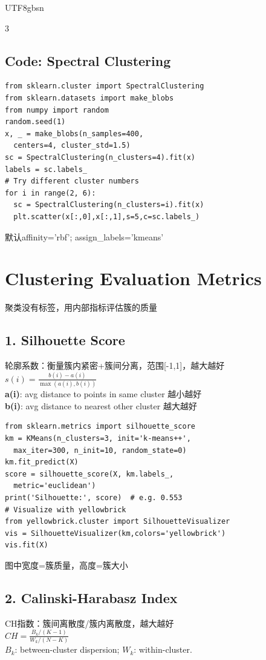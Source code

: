 \documentclass[9pt,landscape,a4paper]{article}
\newcommand{\zhint}[1]{{\scriptsize\color{gray!70!black}#1}}
\begin{document}
\begin{CJK}{UTF8}{gbsn}
\begin{multicols}{3}
\subsection{Code: Spectral Clustering}
\begin{lstlisting}
from sklearn.cluster import SpectralClustering
from sklearn.datasets import make_blobs
from numpy import random
random.seed(1)
x, _ = make_blobs(n_samples=400,
  centers=4, cluster_std=1.5)
sc = SpectralClustering(n_clusters=4).fit(x)
labels = sc.labels_
# Try different cluster numbers
for i in range(2, 6):
  sc = SpectralClustering(n_clusters=i).fit(x)
  plt.scatter(x[:,0],x[:,1],s=5,c=sc.labels_)
\end{lstlisting}
\zhint{默认affinity='rbf'; assign\_labels='kmeans'}

\section{Clustering Evaluation Metrics}
\zhint{聚类没有标签，用内部指标评估簇的质量}

\subsection{1. Silhouette Score}
\zhint{轮廓系数：衡量簇内紧密+簇间分离，范围[-1,1]，越大越好}\\
$s(i) = \frac{b(i) - a(i)}{\max(a(i), b(i))}$\\
\textbf{a(i)}: avg distance to points in same cluster \zhint{越小越好}\\
\textbf{b(i)}: avg distance to nearest other cluster \zhint{越大越好}

\begin{lstlisting}
from sklearn.metrics import silhouette_score
km = KMeans(n_clusters=3, init='k-means++',
  max_iter=300, n_init=10, random_state=0)
km.fit_predict(X)
score = silhouette_score(X, km.labels_,
  metric='euclidean')
print('Silhouette:', score)  # e.g. 0.553
# Visualize with yellowbrick
from yellowbrick.cluster import SilhouetteVisualizer
vis = SilhouetteVisualizer(km,colors='yellowbrick')
vis.fit(X)
\end{lstlisting}
\zhint{图中宽度=簇质量，高度=簇大小}

\subsection{2. Calinski-Harabasz Index}
\zhint{CH指数：簇间离散度/簇内离散度，越大越好}\\
$CH = \frac{B_k / (K-1)}{W_k / (N-K)}$\\
$B_k$: between-cluster dispersion; $W_k$: within-cluster.


\end{multicols}
\end{CJK}
\end{document}
